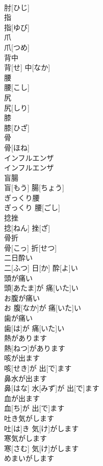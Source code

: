 \documentclass[8pt]{extreport}
\begin{document}
\begin{CJK}{UTF8}{min}
\\	肘[ひじ]		
\\	指	
\\	指[ゆび]		
\\	爪	
\\	爪[つめ]		
\\	背中	
\\	背[せ] 中[なか]		
\\	腰	
\\	腰[こし]		
\\	尻	
\\	尻[しり]		
\\	膝	
\\	膝[ひざ]		
\\	骨	
\\	骨[ほね]		
\\	インフルエンザ	
\\	インフルエンザ		
\\	盲腸	
\\	盲[もう] 腸[ちょう]		
\\	ぎっくり腰	
\\	ぎっくり 腰[ごし]		
\\	捻挫	
\\	捻[ねん] 挫[ざ]		
\\	骨折	
\\	骨[こっ] 折[せつ]		
\\	二日酔い	
\\	二[ふつ] 日[か] 酔[よ]い		
\\	頭が痛い	
\\	頭[あたま]が 痛[いた]い		
\\	お腹が痛い	
\\	お 腹[なか]が 痛[いた]い		
\\	歯が痛い	
\\	歯[は]が 痛[いた]い		
\\	熱があります	
\\	熱[ねつ]があります		
\\	咳が出ます	
\\	咳[せき]が 出[で]ます		
\\	鼻水が出ます	
\\	鼻[はな] 水[みず]が 出[で]ます		
\\	血が出ます	
\\	血[ち]が 出[で]ます		
\\	吐き気がします	
\\	吐[は]き 気[け]がします		
\\	寒気がします	
\\	寒[さむ] 気[け]がします		
\\	めまいがします	

\end{CJK}
\end{document}
